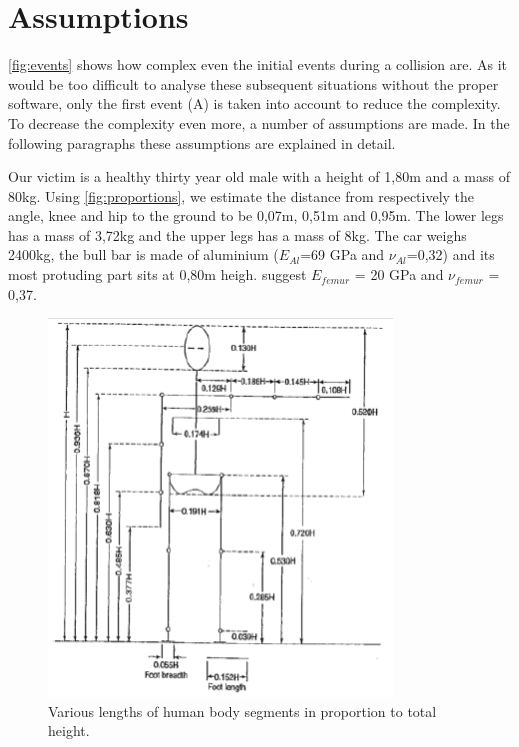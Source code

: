 \section{Assumptions}
\label{sec:assumptions}
\autoref{fig:events} shows how complex even the initial events during a
collision are. As it would be too difficult to analyse these subsequent
situations without the proper software, only the first event (A) is
taken into account to reduce the complexity. To decrease the complexity even
more, a number of assumptions are made. In the following paragraphs these
assumptions are explained in detail.

Our victim is a healthy thirty year old male with a height of 1,80m and a mass
of 80kg. Using \autoref{fig:proportions}, we estimate the distance from
respectively the angle, knee and hip to the ground to be 0,07m, 0,51m and 0,95m.
The lower legs has a mass of 3,72kg and the upper legs has a mass of
8kg\cite{Ob}. The car weighs 2400kg,  the bull bar is made of 
aluminium ($E_{Al}$=69 GPa and $\nu_{Al}$=0,32)
and its most protuding part sits at 0,80m heigh. \cite{huiskes1977geometrical}
suggest $E_{femur}$ = 20 GPa and $\nu_{femur}$ = 0,37.

\begin{figure}[htp]
\begin{center}
  \includegraphics{img/proportions.png}
  \caption{Various lengths of human body segments in proportion to
  total height.}
  \label{fig:proportions}
\end{center}
\end{figure}

